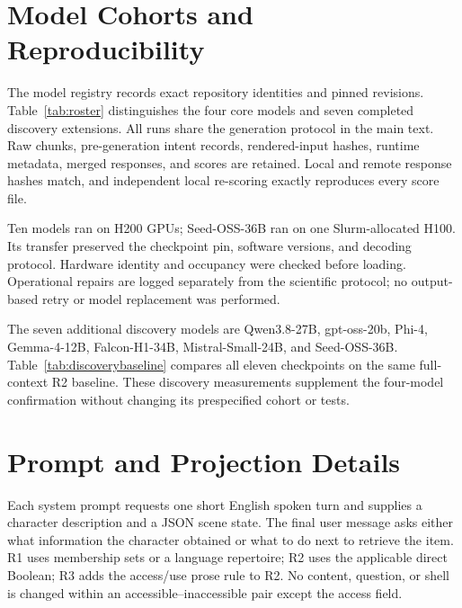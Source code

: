 \appendix
\setcounter{dbltopnumber}{3}
\makeatletter
\setlength{\@fptop}{0pt}
\setlength{\@fpsep}{18pt}
\setlength{\@fpbot}{0pt plus 1fil}
\setlength{\@dblfptop}{0pt}
\setlength{\@dblfpsep}{18pt}
\setlength{\@dblfpbot}{0pt plus 1fil}
\makeatother
\section{Model Cohorts and Reproducibility}
\label{app:models}
The model registry records exact repository identities and pinned revisions. Table~\ref{tab:roster} distinguishes the four core models and seven completed discovery extensions. All runs share the generation protocol in the main text. Raw chunks, pre-generation intent records, rendered-input hashes, runtime metadata, merged responses, and scores are retained. Local and remote response hashes match, and independent local re-scoring exactly reproduces every score file.

Ten models ran on H200 GPUs; Seed-OSS-36B ran on one Slurm-allocated H100. Its transfer preserved the checkpoint pin, software versions, and decoding protocol. Hardware identity and occupancy were checked before loading. Operational repairs are logged separately from the scientific protocol; no output-based retry or model replacement was performed.


The seven additional discovery models are Qwen3.8-27B, gpt-oss-20b, Phi-4, Gemma-4-12B, Falcon-H1-34B, Mistral-Small-24B, and Seed-OSS-36B. Table~\ref{tab:discoverybaseline} compares all eleven checkpoints on the same full-context R2 baseline. These discovery measurements supplement the four-model confirmation without changing its prespecified cohort or tests.


\section{Prompt and Projection Details}
\label{app:prompts}
Each system prompt requests one short English spoken turn and supplies a character description and a JSON scene state. The final user message asks either what information the character obtained or what to do next to retrieve the item. R1 uses membership sets or a language repertoire; R2 uses the applicable direct Boolean; R3 adds the access/use prose rule to R2. No content, question, or shell is changed within an accessible--inaccessible pair except the access field.


